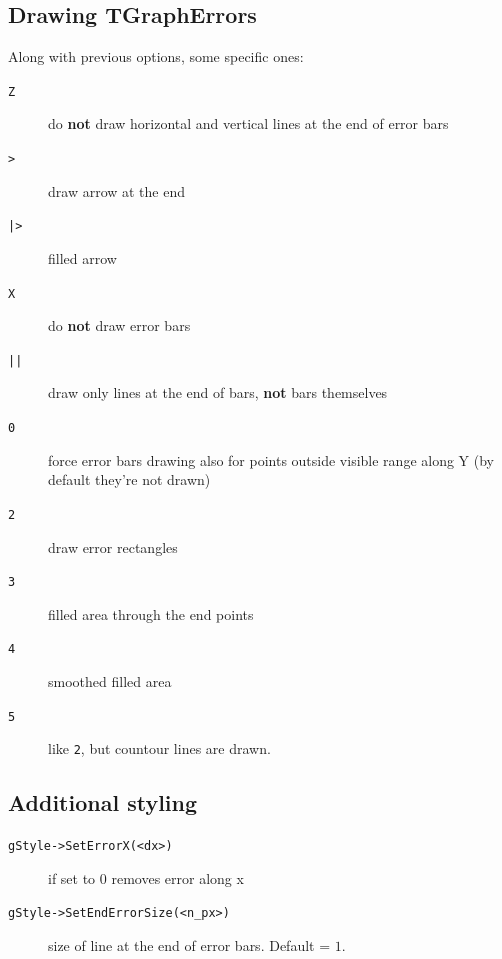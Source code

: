 \documentclass[10pt, oneside]{article}
\begin{document}
\subsection{Drawing TGraphErrors}
Along with previous options, some specific ones:
\begin{description}
\item[\texttt{Z}] do \textbf{not} draw horizontal and vertical lines at the end of error bars
\item[\texttt{>}] draw arrow at the end
\item[\texttt{|>}] filled arrow
\item[\texttt{X}] do \textbf{not} draw error bars
\item[\texttt{||}] draw only lines at the end of bars, \textbf{not} bars themselves
\item[\texttt{0}] force error bars drawing also for points outside visible range along Y (by default they're not drawn)
\item[\texttt{2}] draw error rectangles
\item[\texttt{3}] filled area through the end points
\item[\texttt{4}] smoothed filled area
\item[\texttt{5}] like \texttt{2}, but countour lines are drawn.

\end{description}
\subsection{Additional styling}
\begin{description}
\item[\texttt{gStyle->SetErrorX(<dx>)}] if set to $0$ removes error along x
\item[\texttt{gStyle->SetEndErrorSize(<n\_px>)}] size of line at the end of error bars. Default = $1$.
\end{description}
\end{document}
